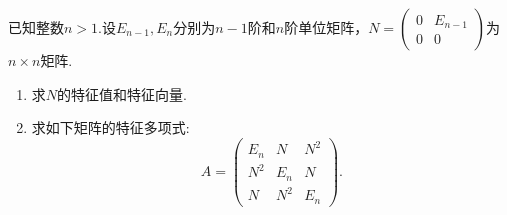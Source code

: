 \documentclass[../../main.tex]{subfiles}%
\begin{document}
\begin{example}
已知整数$n > 1$.设$E_{n - 1}, E_n$分别为$n - 1$阶和$n$阶单位矩阵，$N = \begin{pmatrix} 0 & E_{n - 1} \\ 0 & 0 \end{pmatrix}$为$n \times n$矩阵.
\begin{enumerate}[(1)]
\item 求$N$的特征值和特征向量.

\item 求如下矩阵的特征多项式:
\[
A = \begin{pmatrix} E_n & N & N^2 \\ N^2 & E_n & N \\ N & N^2 & E_n \end{pmatrix}.
\]
\end{enumerate}
\end{example}
\end{document}
